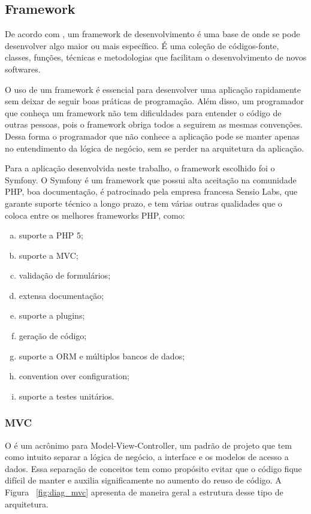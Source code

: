\subsection{Framework}
De acordo com \cite{Minetto}, um framework de desenvolvimento é uma base de onde se pode desenvolver 
algo maior ou mais específico. É uma coleção de códigos-fonte, classes, funções, técnicas e 
metodologias que facilitam o desenvolvimento de novos softwares.

O uso de um framework é essencial para desenvolver uma aplicação rapidamente sem deixar
de seguir boas práticas de programação. Além disso, um programador que conheça um
framework não tem dificuldades para entender o código de outras pessoas, pois o framework obriga todos 
a seguirem as mesmas convenções. Dessa forma o programador que não conhece a aplicação pode se
manter apenas no entendimento da lógica de negócio, sem se perder na arquitetura da aplicação.

Para a aplicação desenvolvida neste trabalho, o framework escolhido foi o Symfony. O Symfony é um 
framework que possui alta aceitação na comunidade PHP, boa documentação, é patrocinado pela 
empresa francesa Sensio Labs, que garante suporte técnico a longo prazo, e tem várias outras 
qualidades que o coloca entre os melhores frameworks PHP, como:

\begin{enumerate}[a.]
\item suporte a PHP 5;
\item suporte a MVC;
\item validação de formulários;
\item extensa documentação;
\item suporte a plugins;
\item geração de código;
\item suporte a ORM e múltiplos bancos de dados;
\item convention over configuration;
\item suporte a testes unitários.
\end{enumerate}

\subsubsection{MVC}
O  é um acrônimo para Model-View-Controller, um padrão de projeto que tem como intuito
separar a lógica de negócio, a interface e os modelos de acesso a dados. Essa separação
de conceitos tem como propósito evitar que o código fique difícil de manter e auxilia
significamente no aumento do reuso de código. A Figura ~\ref{fig:diag_mvc} apresenta de maneira
geral a estrutura desse tipo de arquitetura.

